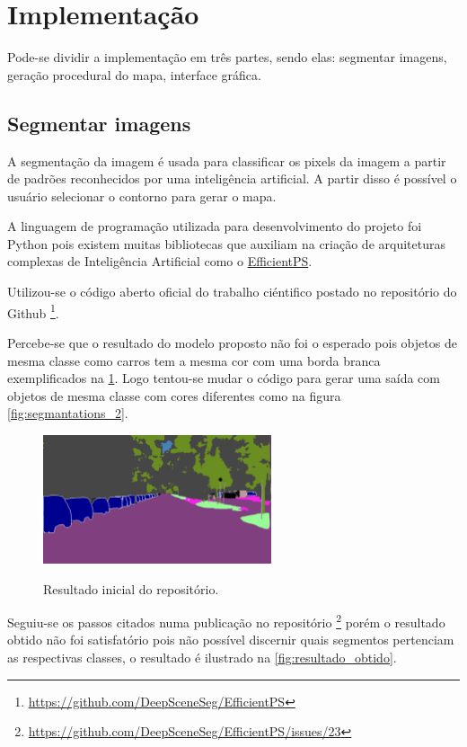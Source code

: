 \section{Implementação}

Pode-se dividir a implementação em três partes, sendo elas: segmentar imagens, geração procedural do mapa, interface gráfica.

\subsection{Segmentar imagens}

A segmentação da imagem é usada para classificar os pixels da imagem a partir de padrões reconhecidos por uma inteligência artificial. A partir disso é possível o usuário selecionar o contorno para gerar o mapa.

A linguagem de programação utilizada para desenvolvimento do projeto foi Python pois existem muitas bibliotecas que auxiliam na criação de arquiteturas complexas de Inteligência Artificial como o \hyperref[sec:EfficientPS]{EfficientPS}.

Utilizou-se o código aberto oficial do trabalho ciéntifico postado no repositório do Github \footnote{\url{https://github.com/DeepSceneSeg/EfficientPS}}.

Percebe-se que o resultado do modelo proposto não foi o esperado pois objetos de mesma classe como carros tem a mesma cor com uma borda branca exemplificados na \cref{fig:resultado_inicial}. Logo tentou-se mudar o código para gerar uma saída com objetos de mesma classe com cores diferentes como na figura \cref{fig:segmantations_2}.

\begin{figure}[!ht]
	\centering
    \caption{Resultado inicial do repositório.}
	\includegraphics[width=0.6\textwidth]{figures/resultado_primario.png}
	\label{fig:resultado_inicial}
\end{figure}

Seguiu-se os passos citados numa publicação no repositório \footnote{\url{https://github.com/DeepSceneSeg/EfficientPS/issues/23}} porém o resultado obtido não foi satisfatório pois não possível discernir quais segmentos pertenciam as respectivas classes, o resultado é ilustrado na \cref{fig:resultado_obtido}.

